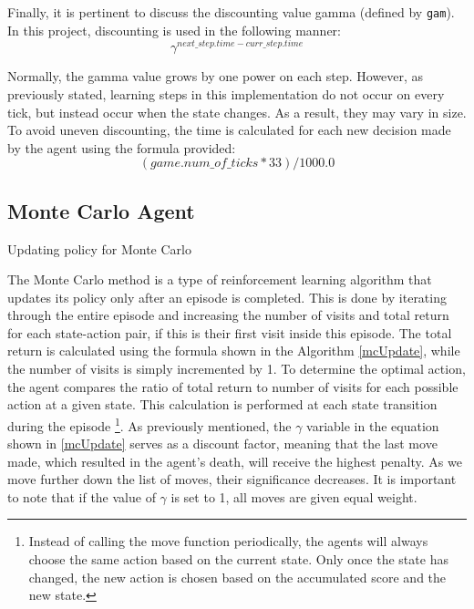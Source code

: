 Finally, it is pertinent to discuss the discounting value gamma (defined by \texttt{gam}). In this project, discounting is used in the following manner: $$\gamma^{next\_step.time - curr\_step.time}$$

Normally, the gamma value grows by one power on each step. However, as previously stated, learning steps in this implementation do not occur on every tick, but instead occur when the state changes. As a result, they may vary in size. To avoid uneven discounting, the time is calculated for each new decision made by the agent using the formula provided:  $$(game.num\_of\_ticks * 33) / 1000.0$$

\subsection{Monte Carlo Agent}

\begin{algorithm}
\caption{Updating policy for Monte Carlo}\label{mcUpdate}
\begin{algorithmic}[1]
\State $R \gets \text{next\_step.score - curr\_step.score}$
\State $G \gets $ $\cdot (R + G)$
}}
\State $total\_return[curr\_step.\text{state\_action}] \gets total\_return[curr\_step.\text{state\_action}] + G$
\State $visits[curr\_step.\text{state\_action}] \gets visits[curr\_step.\text{state\_action}] + 1$
\EndIf
\end{algorithmic}
\end{algorithm}

The Monte Carlo method is a type of reinforcement learning algorithm that updates its policy only after an episode is completed. This is done by iterating through the entire episode and increasing the number of visits and total return for each state-action pair, if this is their first visit inside this episode. The total return is calculated using the formula shown in the Algorithm \ref{mcUpdate}, while the number of visits is simply incremented by 1. To determine the optimal action, the agent compares the ratio of total return to number of visits for each possible action at a given state. This calculation is performed at each state transition during the episode \footnote{Instead of calling the move function periodically, the agents will always choose the same action based on the current state. Only once the state has changed, the new action is chosen based on the accumulated score and the new state.}.
As previously mentioned, the $\gamma$ variable in the equation shown in \ref{mcUpdate} serves as a discount factor, meaning that the last move made, which resulted in the agent's death, will receive the highest penalty. As we move further down the list of moves, their significance decreases. It is important to note that if the value of $\gamma$ is set to 1, all moves are given equal weight. 

